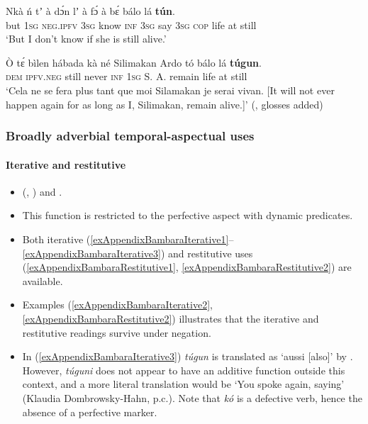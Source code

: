 \begin{exe}
	\ex\label{exAppendixBambara1}
	\gll Nkà ń tʼ à dɔ́n lʼ à fɔ́ à bɛ́ bálo lá \textbf{tún}.\\
	but 1\textsc{sg} \textsc{neg}.\textsc{ipfv} 3\textsc{sg} know \textsc{inf} 3\textsc{sg} say 3\textsc{sg} \textsc{cop} life at still\\
	\glt \lq But I don't know if she is still alive.' \parencite[14]{DombrowskyHahn2021}
	
	\ex\label{exAppendixBambara2}
	\gll Ò tɛ́ bìlen hábada kà né Silimakan Ardo tó bálo lá \textbf{túgun}.\\
	\textsc{dem} \textsc{ipfv}.\textsc{neg} still never \textsc{inf} 1\textsc{sg} S. A. remain life at still\\
	\glt \lq Cela ne se fera plus tant que moi Silamakan je serai vivan. [It will not ever happen again for as long as I, Silimakan, remain alive.]\rq{ }(\cite[327]{Dumestre2003}, glosses added)
\end{exe}

\subsubsection{Broadly adverbial temporal-aspectual uses}
\paragraph{Iterative and restitutive}
\label{appendixBambaraTuguniIterative}
\begin{itemize}
	\item \citeauthor{Dumestre2003} (\citeyear[327]{Dumestre2003}, \citeyear[1003]{Dumestre2011}) and \textcite{DombrowskyHahn2020}.
	\item This function is restricted to the perfective aspect with dynamic predicates.
	\item Both iterative (\ref{exAppendixBambaraIterative1}–\ref{exAppendixBambaraIterative3}) and restitutive uses (\ref{exAppendixBambaraRestitutive1}, \ref{exAppendixBambaraRestitutive2}) are available.
	\item Examples (\ref{exAppendixBambaraIterative2}, \ref{exAppendixBambaraRestitutive2}) illustrates that the iterative and restitutive readings survive under negation.
	\item In (\ref{exAppendixBambaraIterative3}) \textit{túgun} is translated as \lq aussi [also]\rq{ }by \textcite{Dumestre2011}. However, \textit{túguni} does not appear to have an additive function outside this context, and a more literal translation would be \lq You spoke again, saying' (Klaudia Dombrowsky\hyp Hahn, p.c.). Note that \textit{kó} is a defective verb, hence the absence of a perfective marker.
\end{itemize}

